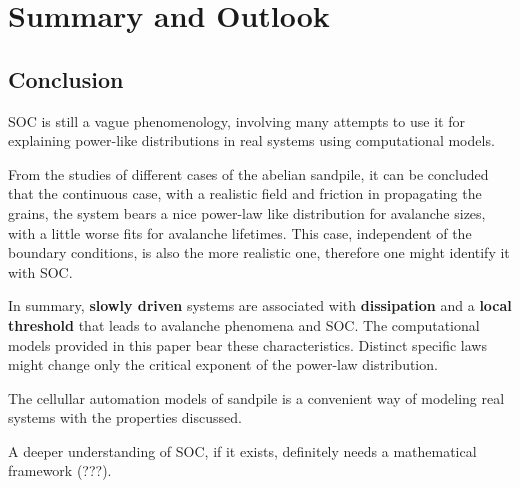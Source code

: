 \chapter{Summary and Outlook}
\thispagestyle{fancy}

\section{Conclusion}
SOC is still a vague phenomenology, involving many attempts to use it for explaining power-like distributions in real systems using computational models.

From the studies of different cases of the abelian sandpile, it can be concluded that the continuous case, with a realistic field and friction in propagating the grains, the system bears a nice power-law like distribution for avalanche sizes, with a little worse fits for avalanche lifetimes. This case, independent of the boundary conditions, is also the more realistic one, therefore one might identify it with SOC. 

In summary, \textbf{slowly driven} systems are associated with \textbf{dissipation} and a \textbf{local threshold} that leads to avalanche phenomena and SOC. The computational models provided in this paper bear these characteristics. Distinct specific laws might change only the critical exponent of the power-law distribution. 

The cellullar automation models of sandpile is a convenient way of modeling real systems with the properties discussed.

A deeper understanding of SOC, if it exists, definitely needs a mathematical framework (???).
